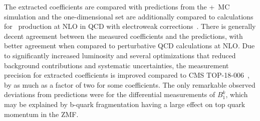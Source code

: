 \begin{refsection}
The extracted coefficients are compared with predictions from the \Powheg+\Pythia\ MC simulation and the one-dimensional set are additionally compared to calculations for \ttbar\ production at NLO in QCD with electroweak corrections~\cite{Bernreuther}.
There is generally decent agreement between the measured coefficients and the predictions, with better agreement when compared to perturbative QCD calculations at NLO.
Due to significantly increased luminosity and several optimizations that reduced background contributions and systematic uncertainties, the measurement precision for extracted coefficients is improved compared to CMS TOP-18-006~\cite{Sirunyan:2681777}, by as much as a factor of two for some coefficients. 
The only remarkable observed deviations from predictions were for the differential measurements of $B_{1}^{k}$, which may be explained by b-quark fragmentation having a large effect on top quark momentum in the \ttbar ZMF.


\end{refsection}
